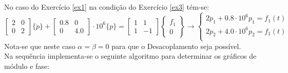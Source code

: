 \documentclass{article}
\begin{document}
\begin{resolution}
    No caso do Exercício \ref{ex1} na condição do Exercício \ref{ex3} tém-se:
    \begin{equation*}
        \begin{bmatrix} 2 & 0\\ 0 & 2\end{bmatrix}\{\ddot{p}\} + 
        \begin{bmatrix} 0.8 & 0\\ 0 & 4.0\end{bmatrix}\cdot 10^6 \{p\} = 
        \begin{bmatrix} 1 & 1\\ 1 & -1\end{bmatrix}\begin{Bmatrix} f_1\\ 0\end{Bmatrix} \to
        \begin{cases}
            2 \ddot{p}_1 + 0.8 \cdot 10^6 p_1 = f_1(t)\\
            2 \ddot{p}_2 + 4.0 \cdot 10^6 p_2 = f_1(t)\\
        \end{cases}
    \end{equation*}
    Nota-se que neste caso $\alpha = \beta = 0$ para que o Desacoplamento seja possível.\\

    Na sequência implementa-se o seguinte algoritmo para determinar os gráficos de módulo e fase:
    \begin{scriptsize}
        \myMatlab
    \end{scriptsize}
\end{resolution}
\end{document}
